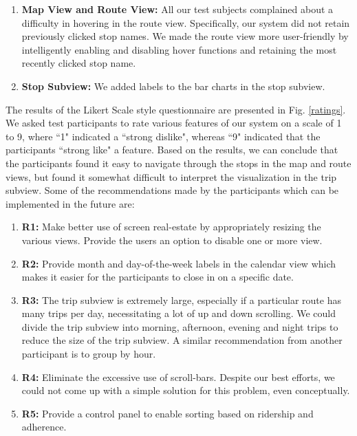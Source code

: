 \documentclass[journal]{vgtc}
\begin{document}
\begin{enumerate}

\item \textbf{Map View and Route View:} All our test subjects complained about a difficulty in hovering in the route view. Specifically, our system did not retain previously clicked stop names. We made the route view more user-friendly by intelligently enabling and disabling hover functions and retaining the most recently clicked stop name. 

\item \textbf{Stop Subview:} We added labels to the bar charts in the stop subview. 

\end{enumerate}

The results of the Likert Scale style questionnaire are presented in Fig. \ref{ratings}. We asked test participants to rate various features of our system on a scale of 1 to 9, where ``1" indicated a ``strong dislike", whereas ``9" indicated that the participants ``strong like" a feature. Based on the results, we can conclude that the participants found it easy to navigate through the stops in the map and route views, but found it somewhat difficult to interpret the visualization in the trip subview. Some of the recommendations made by the participants which can be implemented in the future are: 

\begin{enumerate}

\item[] \textbf{R1:} Make better use of screen real-estate by appropriately resizing the various views. Provide the users an option to disable one or more view. 

\item[] \textbf{R2:} Provide month and day-of-the-week labels in the calendar view which makes it easier for the participants to close in on a specific date. 

\item[] \textbf{R3:} The trip subview is extremely large, especially if a particular route has many trips per day, necessitating a lot of up and down scrolling. We could divide the trip subview into morning, afternoon, evening and night trips to reduce the size of the trip subview. A similar recommendation from another participant is to group by hour. 

\item[] \textbf{R4:} Eliminate the excessive use of scroll-bars. Despite our best efforts, we could not come up with a simple solution for this problem, even conceptually.

\item[] \textbf{R5:} Provide a control panel to enable sorting based on ridership and adherence.

\end{enumerate}
 
\end{document}
